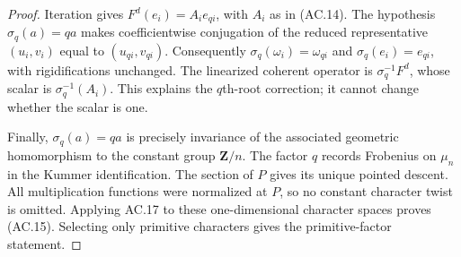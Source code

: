 \begin{proof}
Iteration gives $F^d(e_i)=A_i e_{qi}$, with $A_i$ as in (AC.14).
The hypothesis $\sigma_q(a)=qa$ makes coefficientwise conjugation
of the reduced representative $(u_i,v_i)$ equal to $(u_{qi},v_{qi})$.
Consequently $\sigma_q(\omega_i)=\omega_{qi}$ and
$\sigma_q(e_i)=e_{qi}$, with rigidifications unchanged.
The linearized coherent operator is $\sigma_q^{-1}F^d$,
whose scalar is $\sigma_q^{-1}(A_i)$.
This explains the $q$th-root correction; it cannot change whether
the scalar is one.

Finally, $\sigma_q(a)=qa$ is precisely invariance of the associated
geometric homomorphism to the constant group $\mathbf Z/n$.
The factor $q$ records Frobenius on $\mu_n$ in the Kummer
identification. The section of $P$ gives its unique pointed descent.
All multiplication functions were normalized at $P$, so no constant
character twist is omitted. Applying AC.17 to these one-dimensional
character spaces proves (AC.15). Selecting only primitive characters
gives the primitive-factor statement.
\end{proof}

